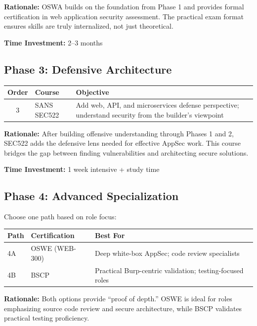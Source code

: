 \documentclass[11pt,letterpaper]{article}
\begin{document}
\textbf{Rationale:} OSWA builds on the foundation from Phase 1 and provides formal certification in web application security assessment. The practical exam format ensures skills are truly internalized, not just theoretical.

\textbf{Time Investment:} 2--3 months

\subsection{Phase 3: Defensive Architecture}

\begin{table}[H]
\centering
\begin{tabularx}{\textwidth}{c l >{\raggedright\arraybackslash}X}
\toprule
\textbf{Order} & \textbf{Course} & \textbf{Objective} \\
\midrule
3 & SANS SEC522 & Add web, API, and microservices defense perspective; understand security from the builder's viewpoint \\
\bottomrule
\end{tabularx}
\end{table}

\textbf{Rationale:} After building offensive understanding through Phases 1 and 2, SEC522 adds the defensive lens needed for effective AppSec work. This course bridges the gap between finding vulnerabilities and architecting secure solutions.

\textbf{Time Investment:} 1 week intensive + study time

\subsection{Phase 4: Advanced Specialization}

Choose one path based on role focus:

\begin{table}[H]
\centering
\begin{tabularx}{\textwidth}{l l >{\raggedright\arraybackslash}X}
\toprule
\textbf{Path} & \textbf{Certification} & \textbf{Best For} \\
\midrule
4A & OSWE (WEB-300) & Deep white-box AppSec; code review specialists \\
\midrule
4B & BSCP & Practical Burp-centric validation; testing-focused roles \\
\bottomrule
\end{tabularx}
\end{table}

\textbf{Rationale:} Both options provide ``proof of depth.'' OSWE is ideal for roles emphasizing source code review and secure architecture, while BSCP validates practical testing proficiency.
\end{document}
